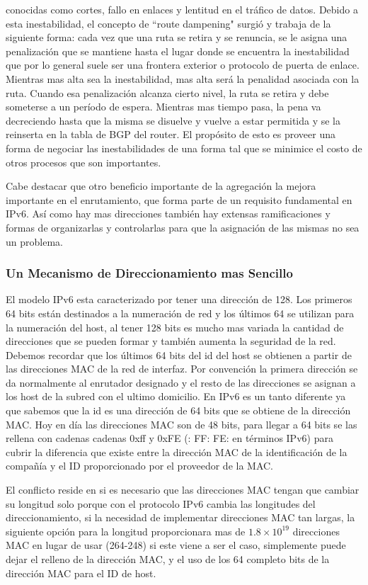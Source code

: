 \documentclass[11pt,a4paper]{article}
\begin{document}
conocidas como cortes, fallo en enlaces y lentitud en el tráfico de datos. Debido a esta 
inestabilidad, el concepto de ``route dampening" surgió y trabaja de la siguiente forma: cada vez que 
una ruta se retira y se renuncia, se le asigna una penalización que se mantiene hasta el lugar donde 
se encuentra la inestabilidad que por lo general suele ser una frontera exterior o  protocolo de 
puerta de enlace. Mientras mas alta sea la inestabilidad, mas alta será la penalidad asociada con la 
ruta. Cuando esa penalización alcanza cierto nivel, la ruta se retira y debe someterse a un período 
de espera. Mientras mas tiempo pasa, la pena va decreciendo hasta que la misma se disuelve y vuelve 
a estar permitida y se la reinserta en la tabla  de BGP del router. El propósito de esto es proveer 
una forma de negociar las inestabilidades de una forma tal que se minimice el costo de otros 
procesos que son importantes.\par
Cabe destacar que otro beneficio importante de la agregación la mejora importante en el 
enrutamiento, que forma parte de un requisito fundamental en IPv6. Así como hay mas direcciones 
también hay extensas ramificaciones y formas de organizarlas y controlarlas para que la asignación 
de las mismas  no sea un problema.

\subsubsection{Un Mecanismo de Direccionamiento  mas Sencillo}
El modelo IPv6 esta  caracterizado por tener una dirección de 128. Los primeros 64 bits están 
destinados a la numeración de red y los últimos 64 se utilizan para la numeración del host, al tener 
128 bits es mucho mas variada la cantidad de direcciones que se pueden formar y también aumenta la 
seguridad de la red. Debemos recordar que los últimos 64 bits del id del host se obtienen a partir 
de las direcciones MAC de la red de interfaz. Por convención la primera dirección se da normalmente 
al enrutador designado y el resto de las direcciones se asignan a los host de la subred con el 
ultimo domicilio. En IPv6 es un tanto diferente ya que  sabemos que la id es una dirección  de 64 
bits que se obtiene de la dirección MAC. Hoy en día las direcciones MAC son de 48 bits, para llegar 
a 64 bits se las rellena con cadenas cadenas 0xff y 0xFE (: FF: FE: en términos IPv6) para cubrir la 
diferencia que existe entre la dirección MAC de la identificación de la compañía y el ID 
proporcionado por el proveedor de la MAC.\par
El conflicto reside en si es necesario que las direcciones MAC tengan que cambiar su longitud  solo 
porque con el protocolo IPv6 cambia las longitudes del direccionamiento, si la necesidad de 
implementar direcciones MAC tan largas, la siguiente opción para la longitud proporcionara mas de 
$1.8 \times 10^{19}$ direcciones MAC en lugar de usar (264-248) si este viene a ser el
caso, simplemente puede dejar el relleno de la dirección MAC, y el uso de los 64 completo
bits de la dirección MAC para el ID de host.
\end{document}
